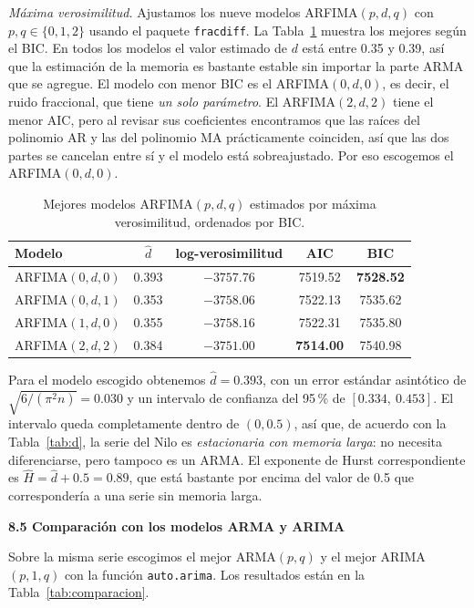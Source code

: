 \documentclass[legalpaper,11pt]{article}
\begin{document}
\begin{enumerate}
\emph{M\'axima verosimilitud.} Ajustamos los nueve modelos ARFIMA$(p,d,q)$ con $p,q \in \{0,1,2\}$ usando el paquete \texttt{fracdiff}. La Tabla~\ref{tab:arfima} muestra los mejores seg\'un el BIC. En todos los modelos el valor estimado de $d$ est\'a entre 0.35 y 0.39, as\'i que la estimaci\'on de la memoria es bastante estable sin importar la parte ARMA que se agregue. El modelo con menor BIC es el ARFIMA$(0,d,0)$, es decir, el ruido fraccional, que tiene \emph{un solo par\'ametro}. El ARFIMA$(2,d,2)$ tiene el menor AIC, pero al revisar sus coeficientes encontramos que las ra\'ices del polinomio AR y las del polinomio MA pr\'acticamente coinciden, as\'i que las dos partes se cancelan entre s\'i y el modelo est\'a sobreajustado. Por eso escogemos el ARFIMA$(0,d,0)$.

\begin{table}[H]
\centering
\begin{tabular}{lcccc}
\hline
\textbf{Modelo} & $\hat d$ & \textbf{log-verosimilitud} & \textbf{AIC} & \textbf{BIC} \\
\hline
ARFIMA$(0,d,0)$ & 0.393 & $-3757.76$ & 7519.52 & \textbf{7528.52} \\
ARFIMA$(0,d,1)$ & 0.353 & $-3758.06$ & 7522.13 & 7535.62 \\
ARFIMA$(1,d,0)$ & 0.355 & $-3758.16$ & 7522.31 & 7535.80 \\
ARFIMA$(2,d,2)$ & 0.384 & $-3751.00$ & \textbf{7514.00} & 7540.98 \\
\hline
\end{tabular}
\caption{Mejores modelos ARFIMA$(p,d,q)$ estimados por m\'axima verosimilitud, ordenados por BIC.}
\label{tab:arfima}
\end{table}

Para el modelo escogido obtenemos $\hat d = 0.393$, con un error est\'andar asint\'otico de $\sqrt{6/(\pi^2 n)} = 0.030$ y un intervalo de confianza del 95\,\% de $[0.334,\ 0.453]$. El intervalo queda completamente dentro de $(0, 0.5)$, as\'i que, de acuerdo con la Tabla~\ref{tab:d}, la serie del Nilo es \emph{estacionaria con memoria larga}: no necesita diferenciarse, pero tampoco es un ARMA. El exponente de Hurst correspondiente es $\hat H = \hat d + 0.5 = 0.89$, que est\'a bastante por encima del valor de 0.5 que corresponder\'ia a una serie sin memoria larga.

\medskip
\noindent\textbf{8.5 Comparaci\'on con los modelos ARMA y ARIMA}

Sobre la misma serie escogimos el mejor ARMA$(p,q)$ y el mejor ARIMA$(p,1,q)$ con la funci\'on \texttt{auto.arima}. Los resultados est\'an en la Tabla~\ref{tab:comparacion}.


\end{enumerate}
\end{document}
